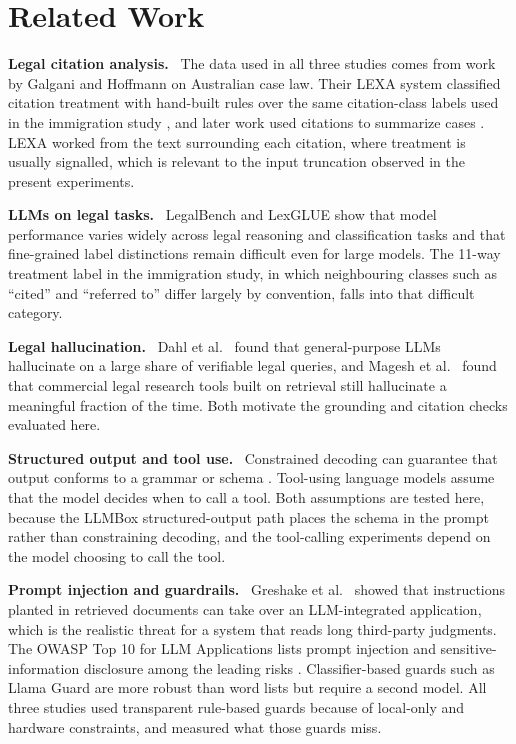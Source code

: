 \documentclass[10pt,letterpaper]{article}
\newcommand{\para}[1]{\textbf{#1}\ }
\begin{document}
\section{Related Work}
\para{Legal citation analysis.} The data used in all three studies comes from work by Galgani and Hoffmann on Australian case law. Their LEXA system classified citation treatment with hand-built rules over the same citation-class labels used in the immigration study \cite{lexa}, and later work used citations to summarize cases \cite{galgani2012a}. LEXA worked from the text surrounding each citation, where treatment is usually signalled, which is relevant to the input truncation observed in the present experiments.

\para{LLMs on legal tasks.} LegalBench \cite{legalbench} and LexGLUE \cite{lexglue} show that model performance varies widely across legal reasoning and classification tasks and that fine-grained label distinctions remain difficult even for large models. The 11-way treatment label in the immigration study, in which neighbouring classes such as ``cited'' and ``referred to'' differ largely by convention, falls into that difficult category.

\para{Legal hallucination.} Dahl et al.\ \cite{dahl} found that general-purpose LLMs hallucinate on a large share of verifiable legal queries, and Magesh et al.\ \cite{magesh} found that commercial legal research tools built on retrieval still hallucinate a meaningful fraction of the time. Both motivate the grounding and citation checks evaluated here.

\para{Structured output and tool use.} Constrained decoding can guarantee that output conforms to a grammar or schema \cite{willard}. Tool-using language models \cite{toolformer} assume that the model decides when to call a tool. Both assumptions are tested here, because the LLMBox structured-output path places the schema in the prompt rather than constraining decoding, and the tool-calling experiments depend on the model choosing to call the tool.

\para{Prompt injection and guardrails.} Greshake et al.\ \cite{greshake} showed that instructions planted in retrieved documents can take over an LLM-integrated application, which is the realistic threat for a system that reads long third-party judgments. The OWASP Top 10 for LLM Applications lists prompt injection and sensitive-information disclosure among the leading risks \cite{owasp}. Classifier-based guards such as Llama Guard \cite{llamaguard} are more robust than word lists but require a second model. All three studies used transparent rule-based guards because of local-only and hardware constraints, and measured what those guards miss.
\end{document}
